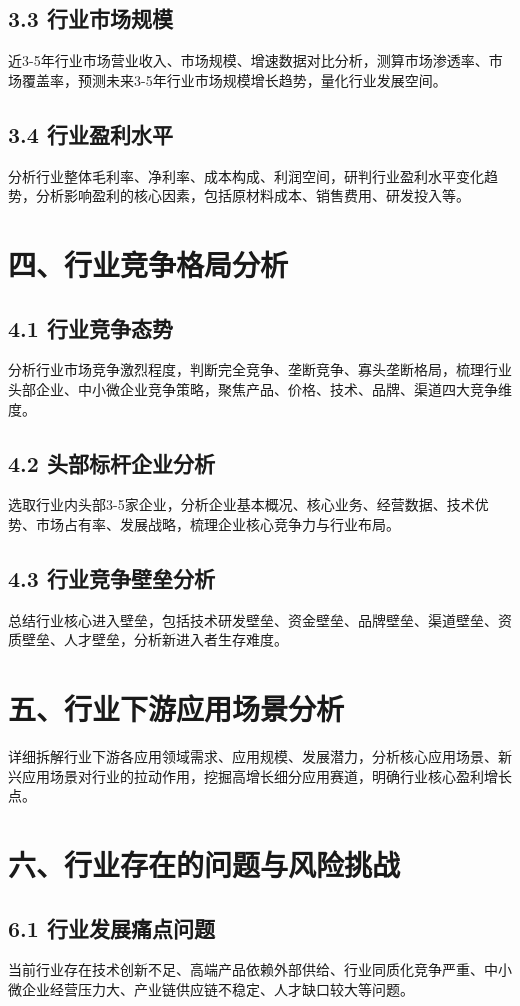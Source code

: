 \documentclass[12pt,a4paper,UTF8]{ctexart}
\begin{document}
\subsection{3.3 行业市场规模}
近3-5年行业市场营业收入、市场规模、增速数据对比分析，测算市场渗透率、市场覆盖率，预测未来3-5年行业市场规模增长趋势，量化行业发展空间。

\subsection{3.4 行业盈利水平}
分析行业整体毛利率、净利率、成本构成、利润空间，研判行业盈利水平变化趋势，分析影响盈利的核心因素，包括原材料成本、销售费用、研发投入等。

\section{四、行业竞争格局分析}
\subsection{4.1 行业竞争态势}
分析行业市场竞争激烈程度，判断完全竞争、垄断竞争、寡头垄断格局，梳理行业头部企业、中小微企业竞争策略，聚焦产品、价格、技术、品牌、渠道四大竞争维度。

\subsection{4.2 头部标杆企业分析}
选取行业内头部3-5家企业，分析企业基本概况、核心业务、经营数据、技术优势、市场占有率、发展战略，梳理企业核心竞争力与行业布局。

\subsection{4.3 行业竞争壁垒分析}
总结行业核心进入壁垒，包括技术研发壁垒、资金壁垒、品牌壁垒、渠道壁垒、资质壁垒、人才壁垒，分析新进入者生存难度。

\section{五、行业下游应用场景分析}
详细拆解行业下游各应用领域需求、应用规模、发展潜力，分析核心应用场景、新兴应用场景对行业的拉动作用，挖掘高增长细分应用赛道，明确行业核心盈利增长点。

\section{六、行业存在的问题与风险挑战}
\subsection{6.1 行业发展痛点问题}
当前行业存在技术创新不足、高端产品依赖外部供给、行业同质化竞争严重、中小微企业经营压力大、产业链供应链不稳定、人才缺口较大等问题。
\end{document}
